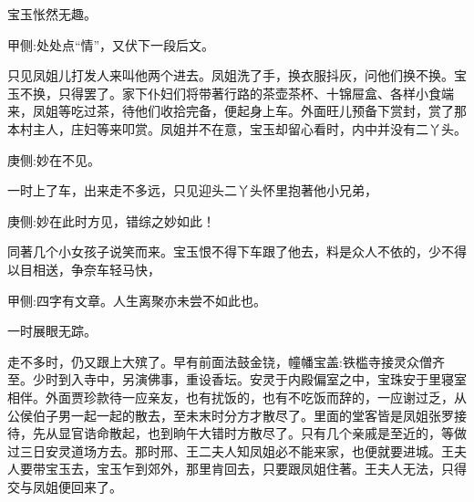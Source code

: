 \begin{parag}
    宝玉怅然无趣。\begin{note}甲侧:处处点“情”，又伏下一段后文。\end{note}只见凤姐儿打发人来叫他两个进去。凤姐洗了手，换衣服抖灰，问他们换不换。宝玉不换，只得罢了。家下仆妇们将带著行路的茶壶茶杯、十锦屉盒、各样小食端来，凤姐等吃过茶，待他们收拾完备，便起身上车。外面旺儿预备下赏封，赏了那本村主人，庄妇等来叩赏。凤姐并不在意，宝玉却留心看时，内中并没有二丫头。\begin{note}庚侧:妙在不见。\end{note}一时上了车，出来走不多远，只见迎头二丫头怀里抱著他小兄弟，\begin{note}庚侧:妙在此时方见，错综之妙如此！\end{note}同著几个小女孩子说笑而来。宝玉恨不得下车跟了他去，料是众人不依的，少不得以目相送，争奈车轻马快，\begin{note}甲侧:四字有文章。人生离聚亦未尝不如此也。\end{note}一时展眼无踪。
\end{parag}


\begin{parag}
    走不多时，仍又跟上大殡了。早有前面法鼓金铙，幢幡宝盖:铁槛寺接灵众僧齐至。少时到入寺中，另演佛事，重设香坛。安灵于内殿偏室之中，宝珠安于里寝室相伴。外面贾珍款待一应亲友，也有扰饭的，也有不吃饭而辞的，一应谢过乏，从公侯伯子男一起一起的散去，至未末时分方才散尽了。里面的堂客皆是凤姐张罗接待，先从显官诰命散起，也到晌午大错时方散尽了。只有几个亲戚是至近的，等做过三日安灵道场方去。那时邢、王二夫人知凤姐必不能来家，也便就要进城。王夫人要带宝玉去，宝玉乍到郊外，那里肯回去，只要跟凤姐住著。王夫人无法，只得交与凤姐便回来了。
\end{parag}


